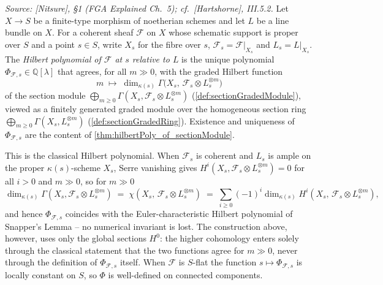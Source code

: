 \begin{definition}
  \textit{Source: [Nitsure], \S 1 (FGA Explained Ch.~5); cf.\ [Hartshorne],
  III.5.2.}
  Let \(X \to S\) be a finite-type morphism of noetherian schemes and let \(L\)
  be a line bundle on \(X\). For a coherent sheaf \(\mathcal{F}\) on \(X\) whose
  schematic support is proper over \(S\) and a point \(s \in S\), write \(X_s\)
  for the fibre over \(s\), \(\mathcal{F}_s = \mathcal{F}|_{X_s}\) and
  \(L_s = L|_{X_s}\). The \emph{Hilbert polynomial of \(\mathcal{F}\) at \(s\)
  relative to \(L\)} is the unique polynomial
  \(\Phi_{\mathcal{F},s} \in \mathbb{Q}[\lambda]\) that agrees, for all
  \(m \gg 0\), with the graded Hilbert function
  \[
    m \;\longmapsto\; \dim_{\kappa(s)} \Gamma\bigl(X_s,\, \mathcal{F}_s \otimes L_s^{\otimes m}\bigr)
  \]
  of the section module
  \(\bigoplus_{m \ge 0} \Gamma(X_s, \mathcal{F}_s \otimes L_s^{\otimes m})\)
  (\cref{def:sectionGradedModule}), viewed as a finitely generated graded module
  over the homogeneous section ring
  \(\bigoplus_{m \ge 0} \Gamma(X_s, L_s^{\otimes m})\)
  (\cref{def:sectionGradedRing}). Existence and uniqueness of
  \(\Phi_{\mathcal{F},s}\) are the content of
  \cref{thm:hilbertPoly_of_sectionModule}.

  This is the classical Hilbert polynomial. When \(\mathcal{F}_s\) is coherent
  and \(L_s\) is ample on the proper \(\kappa(s)\)-scheme \(X_s\), Serre vanishing
  gives \(H^i(X_s, \mathcal{F}_s \otimes L_s^{\otimes m}) = 0\) for all \(i > 0\)
  and \(m \gg 0\), so for \(m \gg 0\)
  \[
    \dim_{\kappa(s)} \Gamma(X_s, \mathcal{F}_s \otimes L_s^{\otimes m})
    \;=\; \chi(X_s,\, \mathcal{F}_s \otimes L_s^{\otimes m})
    \;=\; \sum_{i \ge 0} (-1)^i \dim_{\kappa(s)} H^i(X_s,\, \mathcal{F}_s \otimes L_s^{\otimes m}),
  \]
  and hence \(\Phi_{\mathcal{F},s}\) coincides with the Euler-characteristic
  Hilbert polynomial of Snapper's Lemma -- no numerical invariant is lost. The
  construction above, however, uses only the global sections \(H^0\): the higher
  cohomology enters solely through the classical statement that the two functions
  agree for \(m \gg 0\), never through the definition of \(\Phi_{\mathcal{F},s}\)
  itself. When \(\mathcal{F}\) is \(S\)-flat the function
  \(s \mapsto \Phi_{\mathcal{F},s}\) is locally constant on \(S\), so \(\Phi\) is
  well-defined on connected components.
\end{definition}

